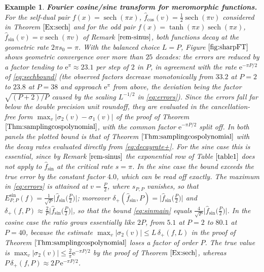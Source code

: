 \documentclass[11pt,a4paper]{scrartcl}
\newtheorem{example}[theorem]{Example}
\numberwithin{equation}{section}
\numberwithin{table}{section}
\numberwithin{figure}{section}
\newcommand{\e}{\mathrm e}
\newcommand{\fcos}{{\hat f}_{\cos}}
\newcommand{\fsin}{{\hat f}_{\sin}}
\newcommand{\dpl}{\delta_{+}}
\newcommand{\Esin}{E^{\sin}}
\begin{document}
\begin{example}
	\label{Ex:sechnum} \textbf{Fourier cosine/sine transform for meromorphic functions.}
	For the self-dual pair $f(x)=\operatorname{sech}(\pi x)$, $\fcos(v) =
	\tfrac12\operatorname{sech}(\pi v)$ considered  in Theorem $\ref{Ex:sech}$ and for the odd
	pair $f(x) = \tanh(\pi x)\operatorname{sech}(\pi x)$, $\fsin(v) =
	v\operatorname{sech}(\pi v)$ of Remark $\ref{rem-sinus}$, both functions
	decay at the geometric rate $2\pi s_0 = \pi$. With the balanced choice $L = P$,
	Figure $\ref{fig:sharpFT}$ shows geometric convergence over more than $25$ decades: the errors are
	reduced by a factor tending to $\e^{\pi} \approx 23.1$ per step of $2$ in $P$, in agreement
	with the rate $\e^{-\pi P/2}$ of \eqref{eq:sechbound} (the observed factors decrease
	monotonically from $33.2$ at $P=2$ to $23.8$ at $P=38$ and approach $\e^{\pi}$ from above, the
	deviation being the factor $\sqrt{(P+2)/P}$ caused by the scaling $L^{-1/2}$ in
	\eqref{eq:errors}). Since the errors fall far below the double precision unit roundoff, they are
	evaluated in the cancellation-free form $\max_{v}|\sigma_2(v) - \sigma_1(v)|$ of the proof of
	Theorem $\ref{Thm:samplingcospolynomial}$, with the common factor $\e^{-\pi P/2}$ split off.
	In both panels the plotted bound is that of
	Theorem $\ref{Thm:samplingcospolynomial}$ with the decay rates evaluated directly from
	\eqref{eq:decayrate+}. For the sine case this is essential, since by Remark $\ref{rem-sinus}$ the
	exponential row of Table $\ref{table1}$ does not apply to $\fsin$ at the critical rate $s=\pi$.
	In the sine case the bound exceeds the true error by the constant factor $4.0$, which can be
	read off exactly. The maximum in \eqref{eq:errors} is attained at $v=\frac{P}{2}$, where
	$s_{P,P}$ vanishes, so that $\Esin_{P,P}(f) = \frac{1}{\sqrt P}\big|\fsin\big(\frac P2\big)\big|$;
	moreover $\dpl(\fsin,P) = \big|\fsin\big(\frac P2\big)\big|$ and
	$\dpl(f,P) \approx \frac{2}{P}\big|\fsin\big(\frac P2\big)\big|$, so that the bound
	\eqref{eq:sinmain} equals $\frac{4}{\sqrt P}\big|\fsin\big(\frac P2\big)\big|$. In the cosine
	case the ratio grows essentially like $2P$, from $5.1$ at $P=2$ to $80.1$ at $P=40$, because
	the estimate $\max_v|\sigma_2(v)| \le L\,\dpl(f,L)$ in the proof of
	Theorem $\ref{Thm:samplingcospolynomial}$ loses a factor of order $P$. The true value is
	$\max_v|\sigma_2(v)| \le \frac{2}{\pi}\e^{-\pi P/2}$ by the proof of Theorem $\ref{Ex:sech}$,
	whereas $P\,\dpl(f,P) \approx 2P\,\e^{-\pi P/2}$.
\end{example}
\end{document}
